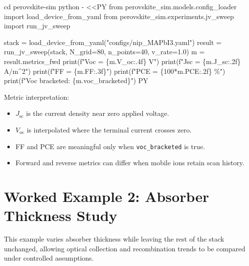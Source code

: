 \documentclass[
  11pt,
  american,
]{report}
\newenvironment{Shaded}{}{}
\newcommand{\AttributeTok}[1]{\textcolor[rgb]{0.49,0.56,0.16}{#1}}
\newcommand{\BuiltInTok}[1]{#1}
\newcommand{\ExtensionTok}[1]{#1}
\newcommand{\NormalTok}[1]{#1}
\newcommand{\OperatorTok}[1]{\textcolor[rgb]{0.40,0.40,0.40}{#1}}
\newcommand{\StringTok}[1]{\textcolor[rgb]{0.25,0.44,0.63}{#1}}
\providecommand{\tightlist}{%
  \setlength{\itemsep}{0pt}\setlength{\parskip}{0pt}}
\begin{document}
\begin{Shaded}
\begin{Highlighting}[]
\BuiltInTok{cd}\NormalTok{ perovskite{-}sim}
\ExtensionTok{python} \AttributeTok{{-}} \OperatorTok{\textless{}\textless{}\textquotesingle{}PY\textquotesingle{}}
\StringTok{from perovskite\_sim.models.config\_loader import load\_device\_from\_yaml}
\StringTok{from perovskite\_sim.experiments.jv\_sweep import run\_jv\_sweep}

\StringTok{stack = load\_device\_from\_yaml("configs/nip\_MAPbI3.yaml")}
\StringTok{result = run\_jv\_sweep(stack, N\_grid=80, n\_points=40, v\_rate=1.0)}
\StringTok{m = result.metrics\_fwd}
\StringTok{print(f"Voc = \{m.V\_oc:.4f\} V")}
\StringTok{print(f"Jsc = \{m.J\_sc:.2f\} A/m\^{}2")}
\StringTok{print(f"FF  = \{m.FF:.3f\}")}
\StringTok{print(f"PCE = \{100*m.PCE:.2f\} \%")}
\StringTok{print(f"Voc bracketed: \{m.voc\_bracketed\}")}
\OperatorTok{PY}
\end{Highlighting}
\end{Shaded}

Metric interpretation:

\begin{itemize}
\tightlist
\item
  \(J_\mathrm{sc}\) is the current density near zero applied voltage.
\item
  \(V_\mathrm{oc}\) is interpolated where the terminal current crosses
  zero.
\item
  FF and PCE are meaningful only when \texttt{voc\_bracketed} is true.
\item
  Forward and reverse metrics can differ when mobile ions retain scan
  history.
\end{itemize}

\hypertarget{worked-example-2-absorber-thickness-study}{%
\section{Worked Example 2: Absorber Thickness
Study}\label{worked-example-2-absorber-thickness-study}}

This example varies absorber thickness while leaving the rest of the
stack unchanged, allowing optical collection and recombination trends to
be compared under controlled assumptions.
\end{document}
